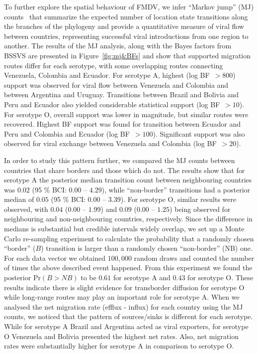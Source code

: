 \documentclass[10pt]{article}
\begin{document}
To further explore the spatial behaviour of FMDV, we infer ``Markov jump'' (MJ) counts~\cite{Minin2008} that summarize the expected number of location state transitions along the  branches of the phylogeny and provide a quantitative measure of viral flow between countries, representing successful viral introductions from one region to another.
The results of the MJ analysis, along with the Bayes factors from BSSVS are presented in Figure~\ref{fig:mj&BFs} and show that supported migration routes differ for each serotype, with some overlapping routes connecting Venezuela, Colombia and Ecuador.
For serotype A, highest (log BF~$>800$) support was observed for viral flow between Venezuela and Colombia and between Argentina and Uruguay.
Transitions between Brazil and Bolivia and Peru and Ecuador also yielded considerable statistical support (log BF~$>10$).
For serotype O, overall support was lower in magnitude, but similar routes were recovered.
Highest BF support was found for transition between Ecuador and Peru and Colombia and Ecuador (log BF~$>100$). Significant support was also observed for viral exchange between Venezuela and Colombia (log BF~$>20$). 

In order to study this pattern further, we compared the MJ counts between countries that share borders and those which do not.
The results show that for serotype A the posterior median transition count between neighbouring countries was $0.02$ (95 \% BCI: $0.00$ -- $4.29$), while ``non-border'' transitions had a posterior median of $0.05$ (95 \% BCI: $0.00$ --  $3.39$).
For serotype O, similar results were observed, with $0.04$ ($0.00$ -- $1.99$) and $0.09$ ($0.00$ -- $1.25$) being observed for neighbouring and non-neighbouring countries, respectively.
Since the difference in medians is substantial but credible intervals widely overlap, we set up a Monte Carlo re-sampling experiment to calculate the probability that a randomly chosen ``border'' ($B$) transition is larger than a randomly chosen ``non-border'' (NB) one.
For each data vector we obtained $100,000$ random draws and counted the number of times the above described event happened.
From this experiment we found the posterior $\mbox{Pr}(B>NB)$  to be $0.61$ for serotype A and $0.43$ for serotype O.
These results indicate there is slight evidence for transborder diffusion for serotype O while long-range routes may play an important role for serotype A.
When we analysed the net migration rate (efflux - influx) for each country using the MJ counts, we noticed that the pattern of sources/sinks is different for each serotype.
While for serotype A Brazil and Argentina acted as viral exporters, for serotype O Venezuela and Bolivia presented the highest net rates.
Also, net migration rates were substantially higher for serotype A in comparison to serotype O.
\end{document}
